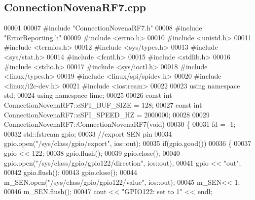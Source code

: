 \subsection{Connection\+Novena\+R\+F7.\+cpp}
\label{ConnectionNovenaRF7_8cpp_source}

\begin{DoxyCode}
00001 
00007 \textcolor{preprocessor}{#include "ConnectionNovenaRF7.h"}
00008 \textcolor{preprocessor}{#include "ErrorReporting.h"}
00009 \textcolor{preprocessor}{#include <errno.h>}
00010 \textcolor{preprocessor}{#include <unistd.h>}
00011 \textcolor{preprocessor}{#include <termios.h>}
00012 \textcolor{preprocessor}{#include <sys/types.h>}
00013 \textcolor{preprocessor}{#include <sys/stat.h>}
00014 \textcolor{preprocessor}{#include <fcntl.h>}
00015 \textcolor{preprocessor}{#include <stdlib.h>}
00016 \textcolor{preprocessor}{#include <stdio.h>}
00017 \textcolor{preprocessor}{#include <sys/ioctl.h>}
00018 \textcolor{preprocessor}{#include <linux/types.h>}
00019 \textcolor{preprocessor}{#include <linux/spi/spidev.h>}
00020 \textcolor{preprocessor}{#include <linux/i2c-dev.h>}
00021 \textcolor{preprocessor}{#include <iostream>}
00022 
00023 \textcolor{keyword}{using namespace }std;
00024 \textcolor{keyword}{using namespace }lime;
00025 
00026 \textcolor{keyword}{const} \textcolor{keywordtype}{int} ConnectionNovenaRF7::cSPI\_BUF\_SIZE = 128;
00027 \textcolor{keyword}{const} \textcolor{keywordtype}{int} ConnectionNovenaRF7::cSPI\_SPEED\_HZ = 2000000;
00028 
00029 ConnectionNovenaRF7::ConnectionNovenaRF7(\textcolor{keywordtype}{void})
00030 \{
00031     fd = -1;
00032     std::fstream gpio;
00033     \textcolor{comment}{//export SEN pin}
00034     gpio.open(\textcolor{stringliteral}{"/sys/class/gpio/export"}, ios::out);
00035     \textcolor{keywordflow}{if}(gpio.good())
00036     \{
00037         gpio << 122;
00038         gpio.flush();
00039         gpio.close();
00040         gpio.open(\textcolor{stringliteral}{"/sys/class/gpio/gpio122/direction"}, ios::out);
00041         gpio << \textcolor{stringliteral}{"out"};
00042         gpio.flush();
00043         gpio.close();
00044         m\_SEN.open(\textcolor{stringliteral}{"/sys/class/gpio/gpio122/value"}, ios::out);
00045         m\_SEN<< 1;
00046         m\_SEN.flush();
00047         cout << \textcolor{stringliteral}{"GPIO122: set to 1"} << endl;

\end{DoxyCode}
